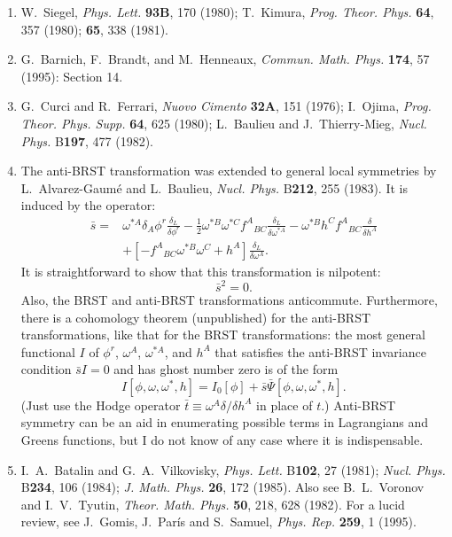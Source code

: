 \begin{enumerate}
  \item {}\label{ch15-ref-15}
  W.~Siegel, \textit{Phys. Lett.} \textbf{93B}, 170 (1980); T.~Kimura, \textit{Prog. Theor. Phys.} \textbf{64}, 357 (1980); \textbf{65}, 338 (1981).

  \item {}\label{ch15-ref-16}
  G.~Barnich, F.~Brandt, and M.~Henneaux, \textit{Commun. Math. Phys.} \textbf{174}, 57 (1995): Section 14.

  \item {}\label{ch15-ref-17}
  G.~Curci and R.~Ferrari, \textit{Nuovo Cimento} \textbf{32A}, 151 (1976); I.~Ojima, \textit{Prog. Theor. Phys. Supp.} \textbf{64}, 625 (1980); L.~Baulieu and J.~Thierry-Mieg, \textit{Nucl. Phys.} B\textbf{197}, 477 (1982).

  \item {}\label{ch15-ref-18}
  The anti-BRST transformation was extended to general local symmetries by L.~Alvarez-Gaum\'e and L.~Baulieu, \textit{Nucl. Phys.} B\textbf{212}, 255 (1983). It is induced by the operator:
  \begin{align*}
    \bar s={}&\omega^{*A}\delta_A\phi^r\frac{\delta_L}{\delta\phi^r}
    -\frac{1}{2}\omega^{*B}\omega^{*C}f^A{}_{BC}\frac{\delta_L}{\delta\omega^{*A}}
    -\omega^{*B}h^Cf^A{}_{BC}\frac{\delta}{\delta h^A}\\
    &+\left[-f^A{}_{BC}\omega^{*B}\omega^C+h^A\right]\frac{\delta_L}{\delta\omega^A}.
  \end{align*}
  It is straightforward to show that this transformation is nilpotent:
  \[
    \bar s^2=0.
  \]
  Also, the BRST and anti-BRST transformations anticommute. Furthermore, there is a cohomology theorem (unpublished) for the anti-BRST transformations, like that for the BRST transformations: the most general functional $I$ of $\phi^r$, $\omega^A$, $\omega^{*A}$, and $h^A$ that satisfies the anti-BRST invariance condition $\bar sI=0$ and has ghost number zero is of the form
  \[
    I[\phi,\omega,\omega^*,h]
    =I_0[\phi]+\bar s\bar\Psi[\phi,\omega,\omega^*,h].
  \]
  (Just use the Hodge operator $\bar t\equiv\omega^A\delta/\delta h^A$ in place of $t$.) Anti-BRST symmetry can be an aid in enumerating possible terms in Lagrangians and Greens functions, but I do not know of any case where it is indispensable.

  \item {}\label{ch15-ref-19}
  I.~A.~Batalin and G.~A.~Vilkovisky, \textit{Phys. Lett.} B\textbf{102}, 27 (1981); \textit{Nucl. Phys.} B\textbf{234}, 106 (1984); \textit{J. Math. Phys.} \textbf{26}, 172 (1985). Also see B.~L.~Voronov and I.~V.~Tyutin, \textit{Theor. Math. Phys.} \textbf{50}, 218, 628 (1982). For a lucid review, see J.~Gomis, J.~Par\'is and S.~Samuel, \textit{Phys. Rep.} \textbf{259}, 1 (1995).


\end{enumerate}
